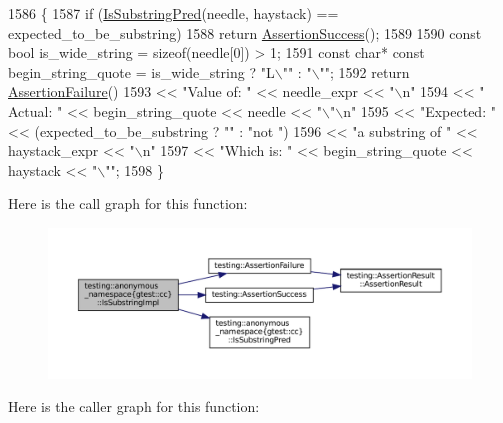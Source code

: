 \begin{DoxyCode}
1586                                                           \{
1587   \textcolor{keywordflow}{if} (\hyperlink{namespacetesting_1_1anonymous__namespace_02gtest_8cc_03_a529b2b4b07a1d3085fc3ee11f65e6b0c}{IsSubstringPred}(needle, haystack) == expected\_to\_be\_substring)
1588     \textcolor{keywordflow}{return} \hyperlink{namespacetesting_ac1d0baedb17286c5c6c87bd1a45da8ac}{AssertionSuccess}();
1589 
1590   \textcolor{keyword}{const} \textcolor{keywordtype}{bool} is\_wide\_string = \textcolor{keyword}{sizeof}(needle[0]) > 1;
1591   \textcolor{keyword}{const} \textcolor{keywordtype}{char}* \textcolor{keyword}{const} begin\_string\_quote = is\_wide\_string ? \textcolor{stringliteral}{"L\(\backslash\)""} : \textcolor{stringliteral}{"\(\backslash\)""};
1592   \textcolor{keywordflow}{return} \hyperlink{namespacetesting_a75cb789614cb1c28c34627a4a3c053df}{AssertionFailure}()
1593       << \textcolor{stringliteral}{"Value of: "} << needle\_expr << \textcolor{stringliteral}{"\(\backslash\)n"}
1594       << \textcolor{stringliteral}{"  Actual: "} << begin\_string\_quote << needle << \textcolor{stringliteral}{"\(\backslash\)"\(\backslash\)n"}
1595       << \textcolor{stringliteral}{"Expected: "} << (expected\_to\_be\_substring ? \textcolor{stringliteral}{""} : \textcolor{stringliteral}{"not "})
1596       << \textcolor{stringliteral}{"a substring of "} << haystack\_expr << \textcolor{stringliteral}{"\(\backslash\)n"}
1597       << \textcolor{stringliteral}{"Which is: "} << begin\_string\_quote << haystack << \textcolor{stringliteral}{"\(\backslash\)""};
1598 \}
\end{DoxyCode}
Here is the call graph for this function\+:
\nopagebreak
\begin{figure}[H]
\begin{center}
\leavevmode
\includegraphics[width=350pt]{namespacetesting_1_1anonymous__namespace_02gtest_8cc_03_a0e1cb1e2b03a87a9c893322e4caab670_cgraph}
\end{center}
\end{figure}
Here is the caller graph for this function\+:
